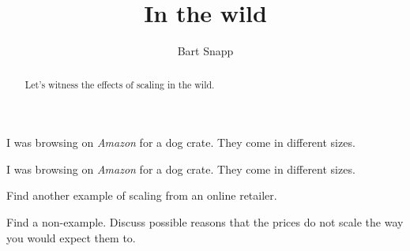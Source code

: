 \documentclass[handout,nooutcomes,noauthor]{ximera}
\title{In the wild}
\author{Bart Snapp}
\begin{document}
\begin{abstract}
  Let's witness the effects of scaling in the wild.
\end{abstract}
\maketitle


\begin{listOutcomes}
\item 
\end{listOutcomes}
I was browsing on \textit{Amazon} for a dog crate. They come in
different sizes.





\mynewpage





\begin{question}
  I was browsing on \textit{Amazon} for a dog crate. They come in
  different sizes.
\end{question}

\mynewpage


\begin{question}
  Find another example of scaling from an online retailer. 
\end{question}

\mynewpage


\begin{question}
  Find a non-example. Discuss possible reasons that the prices do not
  scale the way you would expect them to.
\end{question}
\end{document}
